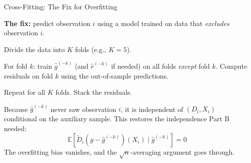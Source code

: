 \documentclass[aspectratio=169, 11pt, handout]{beamer}
\newcommand{\E}{\mathbb{E}}
\begin{document}
\begin{frame}{Cross-Fitting: The Fix for Overfitting}

\textbf{The fix:} predict observation $i$ using a model trained on data that \emph{excludes} observation $i$.

\bigskip

Divide the data into $K$ folds (e.g., $K = 5$).

\bigskip

\begin{center}
\end{center}

For fold $k$: train $\hat{g}^{(-k)}$ (and $\hat{r}^{(-k)}$ if needed) on all folds \emph{except} fold $k$. Compute residuals on fold $k$ using the out-of-sample predictions.

\bigskip

Repeat for all $K$ folds. Stack the residuals.

\bigskip
\pause

Because $\hat{g}^{(-k)}$ never saw observation $i$, it is independent of $(D_i, X_i)$ conditional on the auxiliary sample. This restores the independence Part B needed:
\[
\E\!\left[\tilde{D}_i (g - \hat{g}^{(-k)})(X_i) \;\big|\; \hat{g}^{(-k)}\right] = 0
\]
The overfitting bias vanishes, and the $\sqrt{n}$-averaging argument goes through.

\end{frame}
\end{document}
